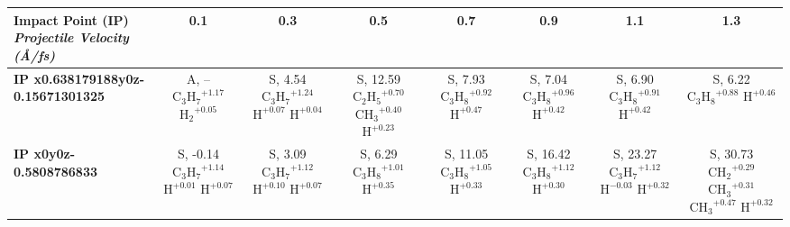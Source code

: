 \begin{table}[t]
\centering
\renewcommand{\arraystretch}{1.2}
\setcellgapes{2pt}\makegapedcells
\begin{tabular}{lccccccc}
\toprule
\makecell{\textbf{Impact Point (IP)}\\\textit{Projectile Velocity (\AA/fs)}} & \textbf{0.1} & \textbf{0.3} & \textbf{0.5} & \textbf{0.7} & \textbf{0.9} & \textbf{1.1} & \textbf{1.3} \\
\midrule
\arrayrulecolor[gray]{0.75}
\textbf{IP x0.638179188y0z-0.15671301325} & \makecell{A, -- \\ $\mathrm{C_3H_7}^{+1.17}$ \\ $\mathrm{H_2}^{+0.05}$} & \makecell{S, 4.54 \\ $\mathrm{C_3H_7}^{+1.24}$ \\ $\mathrm{H}^{+0.07}$ \\ $\mathrm{H}^{+0.04}$} & \makecell{S, 12.59 \\ $\mathrm{C_2H_5}^{+0.70}$ \\ $\mathrm{CH_3}^{+0.40}$ \\ $\mathrm{H}^{+0.23}$} & \makecell{S, 7.93 \\ $\mathrm{C_3H_8}^{+0.92}$ \\ $\mathrm{H}^{+0.47}$} & \makecell{S, 7.04 \\ $\mathrm{C_3H_8}^{+0.96}$ \\ $\mathrm{H}^{+0.42}$} & \makecell{S, 6.90 \\ $\mathrm{C_3H_8}^{+0.91}$ \\ $\mathrm{H}^{+0.42}$} & \makecell{S, 6.22 \\ $\mathrm{C_3H_8}^{+0.88}$ \\ $\mathrm{H}^{+0.46}$} \\
\midrule
\textbf{IP x0y0z-0.5808786833} & \makecell{S, -0.14 \\ $\mathrm{C_3H_7}^{+1.14}$ \\ $\mathrm{H}^{+0.01}$ \\ $\mathrm{H}^{+0.07}$} & \makecell{S, 3.09 \\ $\mathrm{C_3H_7}^{+1.12}$ \\ $\mathrm{H}^{+0.10}$ \\ $\mathrm{H}^{+0.07}$} & \makecell{S, 6.29 \\ $\mathrm{C_3H_8}^{+1.01}$ \\ $\mathrm{H}^{+0.35}$} & \makecell{S, 11.05 \\ $\mathrm{C_3H_8}^{+1.05}$ \\ $\mathrm{H}^{+0.33}$} & \makecell{S, 16.42 \\ $\mathrm{C_3H_8}^{+1.12}$ \\ $\mathrm{H}^{+0.30}$} & \makecell{S, 23.27 \\ $\mathrm{C_3H_7}^{+1.12}$ \\ $\mathrm{H}^{-0.03}$ \\ $\mathrm{H}^{+0.32}$} & \makecell{S, 30.73 \\ $\mathrm{CH_2}^{+0.29}$ \\ $\mathrm{CH_3}^{+0.31}$ \\ $\mathrm{CH_3}^{+0.47}$ \\ $\mathrm{H}^{+0.32}$} \\

\end{tabular}
\end{table}
